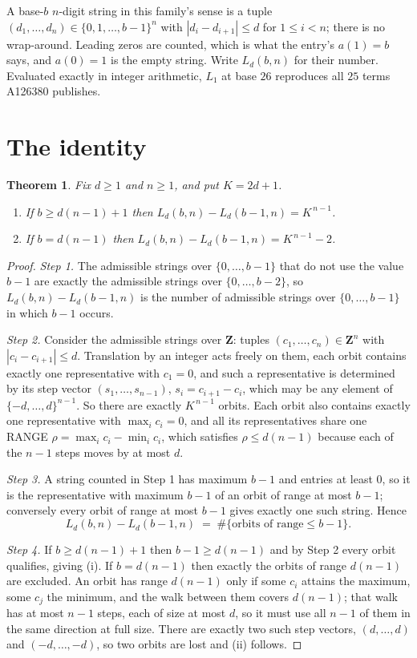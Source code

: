 \documentclass[11pt,a4paper]{article}
\theoremstyle{plain}
\newtheorem{theorem}{Theorem}
\theoremstyle{definition}
\begin{document}
A base-$b$ $n$-digit string in this family's sense is a tuple
$(d_1,\dots,d_n)\in\{0,1,\dots,b-1\}^{n}$ with $|d_i-d_{i+1}|\le d$ for $1\le i<n$; there
is no wrap-around. Leading zeros are counted, which is what the entry's $a(1)=b$ says, and
$a(0)=1$ is the empty string. Write $L_d(b,n)$ for their number. Evaluated exactly in integer
arithmetic, $L_{1}$ at base $26$ reproduces all $25$ terms A126380 publishes.

\section{The identity}

\begin{theorem}
Fix $d\ge1$ and $n\ge1$, and put $K=2d+1$.
\begin{enumerate}
\item[(i)] If $b\ge d(n-1)+1$ then $L_d(b,n)-L_d(b-1,n)=K^{\,n-1}$.
\item[(ii)] If $b=d(n-1)$ then $L_d(b,n)-L_d(b-1,n)=K^{\,n-1}-2$.
\end{enumerate}
\end{theorem}

\begin{proof}
\emph{Step 1.} The admissible strings over $\{0,\dots,b-1\}$ that do not use the value $b-1$
are exactly the admissible strings over $\{0,\dots,b-2\}$, so $L_d(b,n)-L_d(b-1,n)$ is the
number of admissible strings over $\{0,\dots,b-1\}$ in which $b-1$ occurs.

\emph{Step 2.} Consider the admissible strings over $\mathbf{Z}$: tuples
$(c_1,\dots,c_n)\in\mathbf{Z}^{n}$ with $|c_i-c_{i+1}|\le d$. Translation by an integer acts
freely on them, each orbit contains exactly one representative with $c_1=0$, and such a
representative is determined by its step vector $(s_1,\dots,s_{n-1})$, $s_i=c_{i+1}-c_i$,
which may be any element of $\{-d,\dots,d\}^{n-1}$. So there are exactly $K^{\,n-1}$ orbits.
Each orbit also contains exactly one representative with $\max_i c_i=0$, and all its
representatives share one RANGE $\rho=\max_ic_i-\min_ic_i$, which satisfies
$\rho\le d(n-1)$ because each of the $n-1$ steps moves by at most $d$.

\emph{Step 3.} A string counted in Step 1 has maximum $b-1$ and entries at least $0$, so it is
the representative with maximum $b-1$ of an orbit of range at most $b-1$; conversely every orbit
of range at most $b-1$ gives exactly one such string. Hence
\[
L_d(b,n)-L_d(b-1,n)\;=\;\#\{\text{orbits of range}\le b-1\} .
\]

\emph{Step 4.} If $b\ge d(n-1)+1$ then $b-1\ge d(n-1)$ and by Step 2 every orbit qualifies,
giving (i). If $b=d(n-1)$ then exactly the orbits of range $d(n-1)$ are excluded. An orbit has
range $d(n-1)$ only if some $c_i$ attains the maximum, some $c_j$ the minimum, and the walk
between them covers $d(n-1)$; that walk has at most $n-1$ steps, each of size at most $d$, so it
must use all $n-1$ of them in the same direction at full size. There are exactly two such step
vectors, $(d,\dots,d)$ and $(-d,\dots,-d)$, so two orbits are lost and (ii) follows.
\end{proof}
\end{document}
